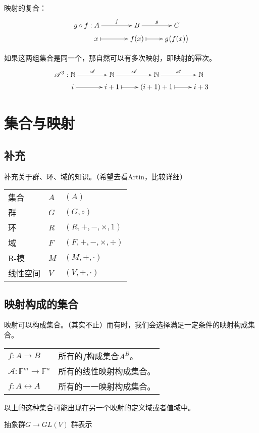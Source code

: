 \documentclass[UTF8]{ctexart}
\begin{document}
映射的复合：
$$
\xymatrix @R=0.2pc{
**[l]g \circ f:A \ar[r]^-{f} & B \ar[r]^{g} & C \\
x \ar @{|->}[r] & f(x) \ar @{|->}[r]& g\big(f(x)\big)
}
$$

如果这两组集合是同一个，那自然可以有多次映射，即映射的幂次。
$$
\xymatrix @C=2pc@R=0.2pc{
**[l]\mathscr{A}^3:\mathbb{N} \ar[r]^-{\mathscr{A}} & \mathbb{N} \ar[r]^{\mathscr{A}} & \mathbb{N} \ar[r]^{\mathscr{A}} & \mathbb{N} \\
i \ar @{|->}[r]& i+1 \ar @{|->}[r]& (i+1)+1 \ar @{|->}[r]& i+3
}
$$

\section{集合与映射}

\subsection{补充}

补充关于群、环、域的知识。（希望去看Artin，比较详细）

\begin{tabular}{lll}
集合&$A$&$(A)$\\
群&$G$&$(G,\circ)$\\
环&$R$&$(R,+,-,\times ,1)$\\
域&$F$&$(F,+,-,\times,\div)$\\
R-模&$M$&$(M,+,·)$\\
线性空间&$V$&$(V,+,·)$
\end{tabular}

\subsection{映射构成的集合}

映射可以构成集合。（其实不止）而有时，我们会选择满足一定条件的映射构成集合。

\begin{tabular}{l l}
$f:A \rightarrow B$&所有的$f$构成集合$A^B$。\\

$\mathscr{A}:\mathbb{F}^m\rightarrow\mathbb{F}^n$&所有的线性映射构成集合。\\

$f:A \leftrightarrow A$&所有的一一映射构成集合。
\end{tabular}

以上的这种集合可能出现在另一个映射的定义域或者值域中。

抽象群$G \rightarrow GL(V)$ 群表示
\end{document}
